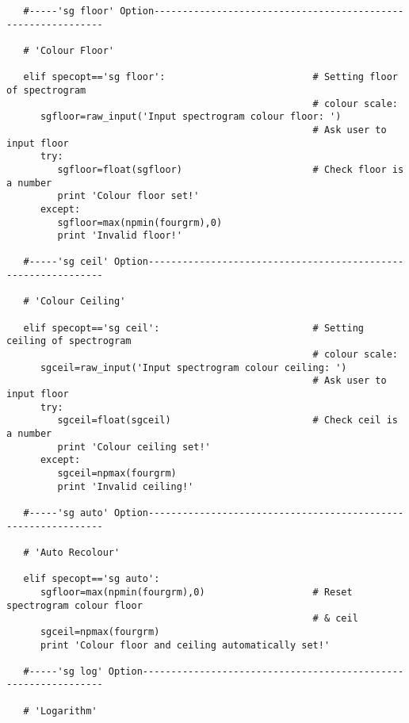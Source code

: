 \begin{verbatim}
   #-----'sg floor' Option-------------------------------------------------------------

   # 'Colour Floor'

   elif specopt=='sg floor':                          # Setting floor of spectrogram
                                                      # colour scale:
      sgfloor=raw_input('Input spectrogram colour floor: ')
                                                      # Ask user to input floor
      try:
         sgfloor=float(sgfloor)                       # Check floor is a number
         print 'Colour floor set!'
      except:
         sgfloor=max(npmin(fourgrm),0)
         print 'Invalid floor!'

   #-----'sg ceil' Option--------------------------------------------------------------

   # 'Colour Ceiling'

   elif specopt=='sg ceil':                           # Setting ceiling of spectrogram
                                                      # colour scale:
      sgceil=raw_input('Input spectrogram colour ceiling: ')
                                                      # Ask user to input floor
      try:
         sgceil=float(sgceil)                         # Check ceil is a number
         print 'Colour ceiling set!'
      except:
         sgceil=npmax(fourgrm)
         print 'Invalid ceiling!'

   #-----'sg auto' Option--------------------------------------------------------------

   # 'Auto Recolour'

   elif specopt=='sg auto':
      sgfloor=max(npmin(fourgrm),0)                   # Reset spectrogram colour floor
                                                      # & ceil
      sgceil=npmax(fourgrm)
      print 'Colour floor and ceiling automatically set!'

   #-----'sg log' Option---------------------------------------------------------------

   # 'Logarithm'


\end{verbatim}
